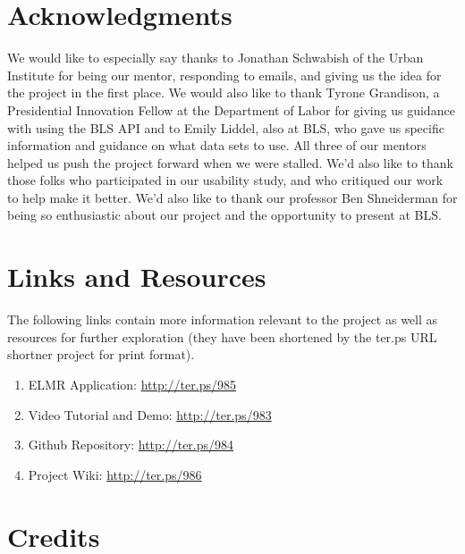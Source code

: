 \documentclass{sigchi}
\begin{document}
\section{Acknowledgments}

We would like to especially say thanks to Jonathan Schwabish of the Urban Institute for being our mentor, responding to emails, and giving us the idea for the project in the first place. We would also like to thank Tyrone Grandison, a Presidential Innovation Fellow at the Department of Labor for giving us guidance with using the BLS API and to Emily Liddel, also at BLS, who gave us specific information and guidance on what data sets to use. All three of our mentors helped us push the project forward when we were stalled. We'd also like to thank those folks who participated in our usability study, and who critiqued our work to help make it better. We'd also like to thank our professor Ben Shneiderman for being so enthusiastic about our project and the opportunity to present at BLS.

\section{Links and Resources}

The following links contain more information relevant to the project as well as resources for further exploration (they have been shortened by the ter.ps URL shortner project for print format).

\begin{enumerate}
    \item ELMR Application: \url{http://ter.ps/985}
    \item Video Tutorial and Demo: \url{http://ter.ps/983}
    \item Github Repository: \url{http://ter.ps/984}
    \item Project Wiki: \url{http://ter.ps/986}
\end{enumerate}

\balance{}




\newpage{}

\balance{}

\section{Credits}
\end{document}
